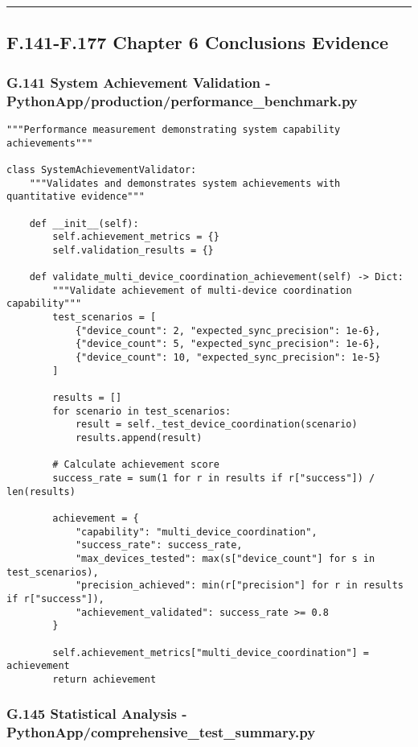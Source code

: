\documentclass[12pt,a4paper]{article}
\begin{document}
{{\hrule

\subsection{F.141-F.177 Chapter 6 Conclusions Evidence}

\subsubsection{G.141 System Achievement Validation - PythonApp/production/performance_benchmark.py}

\begin{verbatim}
"""Performance measurement demonstrating system capability achievements"""

class SystemAchievementValidator:
    """Validates and demonstrates system achievements with quantitative evidence"""
    
    def __init__(self):
        self.achievement_metrics = {}
        self.validation_results = {}
        
    def validate_multi_device_coordination_achievement(self) -> Dict:
        """Validate achievement of multi-device coordination capability"""
        test_scenarios = [
            {"device_count": 2, "expected_sync_precision": 1e-6},
            {"device_count": 5, "expected_sync_precision": 1e-6},
            {"device_count": 10, "expected_sync_precision": 1e-5}
        ]
        
        results = []
        for scenario in test_scenarios:
            result = self._test_device_coordination(scenario)
            results.append(result)
        
        # Calculate achievement score
        success_rate = sum(1 for r in results if r["success"]) / len(results)
        
        achievement = {
            "capability": "multi_device_coordination",
            "success_rate": success_rate,
            "max_devices_tested": max(s["device_count"] for s in test_scenarios),
            "precision_achieved": min(r["precision"] for r in results if r["success"]),
            "achievement_validated": success_rate >= 0.8
        }
        
        self.achievement_metrics["multi_device_coordination"] = achievement
        return achievement
\end{verbatim}

\subsubsection{G.145 Statistical Analysis - PythonApp/comprehensive_test_summary.py}

}}
\end{document}
